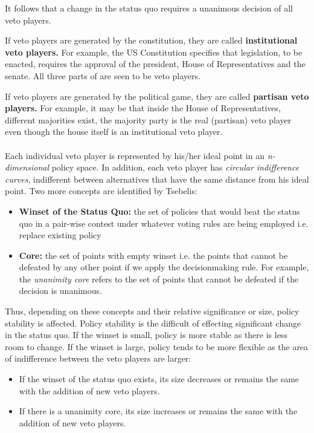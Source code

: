 \documentclass[12pt, letterpaper]{article}
\begin{document}
It follows that a change in the status quo requires a unanimous decision of all veto players. 

If veto players are generated by the constitution, they are called \textbf{institutional veto players.} For example, the US Constitution specifies that legislation, to be enacted, requires the approval of the president, House of Representatives and the senate. All three parts of are seen to be veto players.

If veto players are generated by the political game, they are called \textbf{partisan veto players.} For example, it may be that inside the House of Representatives, different majorities exist, the majority party is the real (partisan) veto player even though the house itself is an institutional veto player.\\\\
Each individual veto player is represented by his/her ideal point in an \textit{n-dimensional} policy space. In addition, each veto player has \textit{circular indifference curves}, indifferent between alternatives that have the same distance from his ideal point.
Two more concepts are identified by Tsebelis:
\begin{itemize}
	\item \textbf{Winset of the Status Quo:} the set of policies that would beat the status quo in a pair-wise contest under whatever voting rules are being employed i.e. replace existing policy
	\item \textbf{Core:} the set of points with empty winset i.e. the points that cannot be defeated by any other point if we apply the decisionmaking rule. For example, the \textit{unanimity core} refers to the set of points that cannot be defeated if the decision is unanimous.
\end{itemize}
Thus, depending on these concepts and their relative significance or size, policy stability is affected. Policy stability is the difficult of effecting significant change in the status quo. If the winset is small, policy is more stable as there is less room to change. If the winset is large, policy tends to be more flexible as the area of indifference between the veto players are larger:
\begin{itemize}
	\item If the winset of the status quo exists, its size decreases or remains the same with the addition of new veto players.
	\item If there is a unanimity core, its size increases or remains the same with the addition of new veto players.

\end{itemize}
\end{document}

